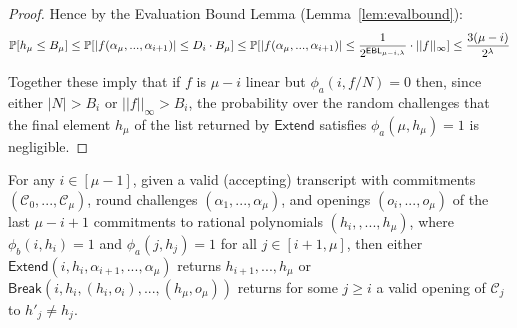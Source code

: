 \begin{proof}
Hence by the Evaluation Bound Lemma (Lemma~\ref{lem:evalbound}): 
$$\Prob[h_\mu \leq B_\mu] \leq \Prob[|f(\alpha_{\mu},...,\alpha_{i+1})| \leq D_i \cdot B_\mu] \leq \Prob[|f(\alpha_{\mu},...,\alpha_{i+1})| \leq \frac{1}{2^{\EBL[\mu - i]}} \cdot ||f||_\infty] \leq  \frac{3(\mu- i)}{2^{\lambda}}$$

 
Together these imply that if $f$ is $\mu-i$ linear but $\phi_a(i, f/N) = 0$ then, since either $|N| > B_i$ or $||f||_\infty > B_i$, the probability over the random challenges that the final element $h_\mu$ of the list returned by $\textsf{Extend}$ satisfies $\phi_a(\mu, h_\mu) = 1$ is negligible. 

\end{proof} 

\begin{subclaim} 
 For any $i \in [\mu-1]$, given a valid (accepting) transcript with commitments $(\mathcal{C}_0,...,\mathcal{C}_\mu)$, round challenges $(\alpha_1,...,\alpha_\mu)$, and openings $(o_i,...,o_\mu)$ of the last $\mu-i + 1$ commitments to rational polynomials $(h_i,,...,h_\mu)$, where $\phi_b(i, h_i) = 1$ and $\phi_a(j, h_j) = 1$ for all $j \in [i+1,\mu]$, then either $\textsf{Extend}(i, h_i, \alpha_{i+1},...,\alpha_\mu)$ returns $h_{i+1},...,h_{\mu}$ or $\textsf{Break}(i, h_i, (h_i, o_i),...,(h_\mu, o_\mu))$ returns for some $j \geq i$ a valid opening of $\mathcal{C}_j$ to $h'_j \neq h_j$.  %
\end{subclaim} 
